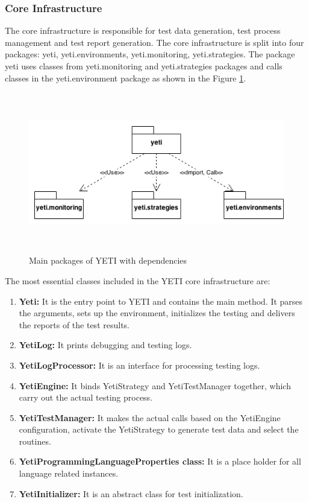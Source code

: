 \subsubsection{Core Infrastructure}
The core infrastructure is responsible for test data generation, test process management and test report generation. The core infrastructure is split into four packages: yeti, yeti.environments, yeti.monitoring, yeti.strategies. The package yeti uses classes from yeti.monitoring and yeti.strategies packages and calls classes in the yeti.environment package as shown in the Figure \ref{fig:yetiCore}. 

\begin{figure}[h]
	\centering
	\includegraphics[width=15cm, height=7cm]{chapter3/yetiCore.png}
	\caption{Main packages of YETI with dependencies }
	\label{fig:yetiCore}
\end{figure}

The most essential classes included in the YETI core infrastructure are:
\begin{enumerate}
\item {\textbf{Yeti:}} It is the entry point to YETI and contains the main method. It parses the arguments, sets up the environment, initializes the testing and delivers the reports of the test results.
\item {\textbf{YetiLog:}} It prints debugging and testing logs. 
\item {\textbf{YetiLogProcessor:}} It is an interface for processing testing logs.
\item {\textbf{YetiEngine:}} It binds YetiStrategy and YetiTestManager together, which carry out the actual testing process.
\item {\textbf{YetiTestManager:}} It makes the actual calls based on the YetiEngine configuration, activate the YetiStrategy to generate test data and select the routines.
\item {\textbf{YetiProgrammingLanguageProperties class:}} It is a place holder for all language related instances.
\item {\textbf{YetiInitializer:}} It is an abstract class for test initialization.
\end{enumerate}

